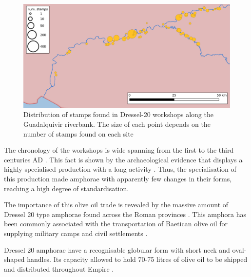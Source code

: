 \documentclass[review]{elsarticle}
\newcommand{\memo}[2]{\textcolor{#1}{#2}}
\newcommand{\xavi}[1]{\memo{magenta}{XRC: #1\\}}
\begin{document}
\begin{figure}[htp]
	\centering
\includegraphics[width=\linewidth]{figs/baetica}
\caption{Distribution of stamps found in Dressel-20 workshops along the Guadalquivir riverbank. The size of each point depends on the number of stamps found on each site}

\label{workshop}
\end{figure} 


The chronology of the workshops is wide spanning from the first to the third centuries AD
\citep{millet_anforas_1998,rodriguez_baetican_1998,chic2005comercio}. 
This fact is shown by the archaeological evidence that displays a highly specialised production with a long activity \citep{remesal_anforas_2004}. Thus, the specialisation of this production made amphorae with apparently few changes in their forms, reaching a high degree of standardisation. 



The importance of this olive oil trade is revealed by the massive amount of Dressel 20 type amphorae found across the Roman provinces \citep{dressel_ricerche_1878,
millet_anforas_1998}. This amphora has been commonly associated with the transportation of Baetican olive oil for supplying military camps and civil settlements \citep{berni_millet_epigrafianforica_2008}.%

Dressel 20 amphorae have a recognisable globular form with short neck and oval-shaped handles. Its capacity allowed to hold 70-75 litres of olive oil to be shipped and distributed throughout Empire \citep{berni_dressel_2016}.
\end{document}
